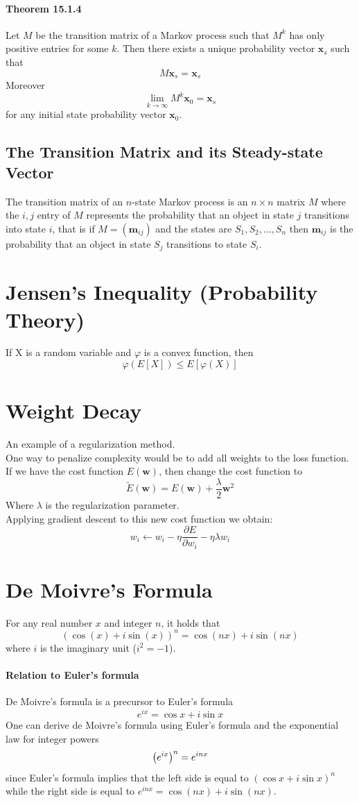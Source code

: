 \documentclass[11pt]{article}
\newcommand{\tb}[1]{\textbf{#1}}
\newcommand{\vx}[0]{\tb{x}}
\newcommand{\vw}[0]{\tb{w}}
\newcommand{\vm}[0]{\tb{m}}
\begin{document}
\paragraph{Theorem 15.1.4}
Let $M$ be the transition matrix of a Markov process such that $M^k$ has only positive entries for some $k$. Then there exists a unique probability vector $\vx_s$ such that $$M\vx_s = \vx_s$$
Moreover
$$\underset{k \rightarrow \infty}{\lim} M^k\vx_0 = \vx_s$$
for any initial state probability vector $\vx_0$.

\subsection{The Transition Matrix and its Steady-state Vector}
The transition matrix of an $n$-state Markov process is an $n\times n$ matrix $M$ where the $i,j$ entry of $M$ represents the probability that an object in state $j$ transitions into state $i$, that is if $M = (\vm_{ij})$ and the states are $S_1, S_2, \hdots, S_n$ then $\vm_{ij}$ is the probability that an object in state $S_j$ transitions to state $S_i$.

\section{Jensen's Inequality (Probability Theory)}
If X is a random variable and $\varphi$ is a convex function, then
$$\varphi(E[X]) \leq E[\varphi(X)]$$

\section{Weight Decay}
An example of a regularization method. \\
One way to penalize complexity would be to add all weights to the loss function. \\
If we have the cost function $E(\vw)$, then change the cost function to
$$\tilde{E}(\vw) = E(\vw) + \frac{\lambda}{2} \vw^2$$
Where $\lambda$ is the regularization parameter.\\
Applying gradient descent to this new cost function we obtain:
$$w_i \leftarrow w_i - \eta \frac{\partial E}{\partial w_i} - \eta\lambda w_i$$
\section{De Moivre's Formula}
For any real number $x$ and integer $n$, it holds that
$$(\cos (x) + i\sin(x))^n = \cos (nx) + i\sin(nx)$$
where $i$ is the imaginary unit ($i^2 = -1$).
\paragraph{Relation to Euler's formula}
De Moivre's formula is a precursor to Euler's formula
$$e^{ix} = \cos x + i \sin x$$
One can derive de Moivre's formula using Euler's formula and the exponential law for integer powers $${\left(e^{i x}\right)^{n}=e^{i n x}} \\ $$
since Euler's formula implies that the left side is equal to $(\cos x+i \sin x)^{n}$ while the right side is equal to  $e^{i n x}=\cos (n x)+i \sin (n x)$.
\end{document}
